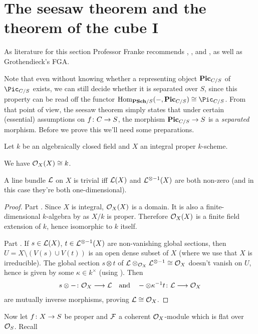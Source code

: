 \documentclass[a4paper,parskip=half,numbers=enddot, DIV=12]{scrreprt}
\begin{document}
\section{The seesaw theorem and the theorem of the cube I}
As literature for this section Professor Franke recommends \cite{mumford1974abelian}, \cite{cornell1986arithmetic}, and \cite{kleiman}, as well as Grothendieck's FGA.

Note that even without knowing whether a representing object $\mathbf{Pic}_{C/S}$ of $\Pic_{C/S}$ exists, we can still decide whether it is separated over $S$, since this property can be read off the functor $\Hom_{\cat{PSch}/S}(-,\PIC_{C/S})\cong\Pic_{C/S}$. From that point of view, the seesaw theorem simply states that under certain (essential) assumptions on $f\colon C\morphism S$, the morphism $\PIC_{C/S}\morphism S$ is a \emph{separated} morphism. Before we prove this we'll need some preparations.
\begin{prop}
	Let $k$ be an algebraically closed field and $X$ an integral proper $k$-scheme.
	\begin{alphanumerate}
		\item We have $\mathcal{O}_X(X)\cong k$.
		\item A line bundle $\mathcal{L}$ on $X$ is trivial iff $\mathcal{L}(X)$ and $\mathcal{L}^{\otimes -1}(X)$ are both non-zero (and in this case they're both one-dimensional).
	\end{alphanumerate}
\end{prop}
\begin{proof}
	Part . Since $X$ is integral, $\mathcal{O}_X(X)$ is a domain. It is also a finite-dimensional $k$-algebra by \cite[Theorem~5]{alggeo2} as $X/k$ is proper. Therefore $\mathcal{O}_X(X)$ is a finite field extension of $k$, hence isomorphic to $k$ itself.
	
	Part . If $s\in\mathcal{L}(X)$, $t\in\mathcal{L}^{\otimes -1}(X)$ are non-vanishing global sections, then $U=X\setminus(V(s)\cup V(t))$ is an open dense subset of $X$ (where we use that $X$ is irreducible). The global section $s\otimes t$ of $\mathcal{L}\otimes_{\mathcal{O}_X}\mathcal{L}^{\otimes -1}\cong \mathcal{O}_X$ doesn't vanish on $U$, hence is given by some $\kappa\in k^\times$ (using ). Then
	\begin{align*}
		s\otimes-\colon \Oo_X\morphism \Ll\quad\text{and}\quad-\otimes\kappa^{-1}t\colon \Ll\morphism\Oo_X
	\end{align*}
	are mutually inverse morphisms, proving $\mathcal{L}\cong \mathcal{O}_X$.
\end{proof}
Now let $f\colon X\morphism S$ be proper and $\mathcal{F}$ a coherent $\mathcal{O}_X$-module which is flat over $\mathcal{O}_S$. Recall
\end{document}
